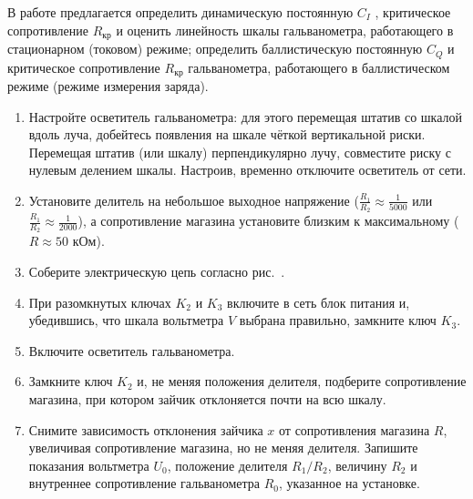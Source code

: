 \begin{lab:task}
	

В работе предлагается определить динамическую постоянную $C_I$ , критическое
сопротивление $R_{\text{кр}}$ и оценить линейность шкалы гальванометра, работающего в
стационарном (токовом) режиме; определить баллистическую постоянную $C_Q$ и
критическое сопротивление $R_{\text{кр}}$ гальванометра, работающего в баллистическом
режиме (режиме измерения заряда).
	\begin{enumerate}

	\item Настройте осветитель гальванометра: для этого перемещая штатив со
шкалой вдоль луча, добейтесь появления на шкале чёткой вертикальной
риски. Перемещая штатив (или шкалу) перпендикулярно лучу, совместите
риску с нулевым делением шкалы. Настроив, временно отключите осветитель
от сети.

	\item Установите делитель на небольшое выходное напряжение ($\frac{R_1}{R_2} \approx \frac{1}{5000}$ или $\frac{R_1}{R_2} \approx \frac{1}{2000}$), а
сопротивление магазина установите близким к максимальному ($R \approx 50$ кОм).

	\item Соберите электрическую цепь согласно рис.~.

	\item При разомкнутых ключах $K_2$ и
$K_3$ включите в сеть блок питания и, убедившись,
что шкала вольтметра $V$ выбрана правильно, замкните ключ
$K_3$.

	\item Включите осветитель гальванометра.

	\item Замкните ключ $K_2$ и, не меняя положения
делителя, подберите сопротивление магазина, при котором зайчик
отклоняется почти на всю шкалу.


	\item Снимите зависимость отклонения зайчика $x$ от сопротивления
магазина $R$, увеличивая сопротивление магазина, но не меняя
делителя. Запишите показания вольтметра $U_0$,
положение делителя $R_1/R_2$,
величину $R_2$ и внутреннее сопротивление
гальванометра $R_0$, указанное на установке.



\end{enumerate}
\end{lab:task}
